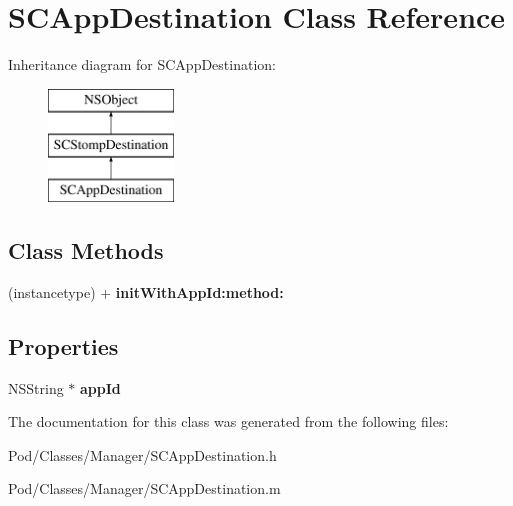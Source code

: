 \hypertarget{interface_s_c_app_destination}{}\section{S\+C\+App\+Destination Class Reference}
\label{interface_s_c_app_destination}
Inheritance diagram for S\+C\+App\+Destination\+:\begin{figure}[H]
\begin{center}
\leavevmode
\includegraphics[height=3.000000cm]{interface_s_c_app_destination}
\end{center}
\end{figure}
\subsection*{Class Methods}
\begin{DoxyCompactItemize}
\item 
(instancetype) + {\bfseries init\+With\+App\+Id\+:method\+:}\hypertarget{interface_s_c_app_destination_a30bffb96df31611307f7927ebcf0427a}{}\label{interface_s_c_app_destination_a30bffb96df31611307f7927ebcf0427a}

\end{DoxyCompactItemize}
\subsection*{Properties}
\begin{DoxyCompactItemize}
\item 
N\+S\+String $\ast$ {\bfseries app\+Id}\hypertarget{interface_s_c_app_destination_a003f294e8bbd0efad135d09d3d5e8fdc}{}\label{interface_s_c_app_destination_a003f294e8bbd0efad135d09d3d5e8fdc}

\end{DoxyCompactItemize}


The documentation for this class was generated from the following files\+:\begin{DoxyCompactItemize}
\item 
Pod/\+Classes/\+Manager/S\+C\+App\+Destination.\+h\item 
Pod/\+Classes/\+Manager/S\+C\+App\+Destination.\+m\end{DoxyCompactItemize}
